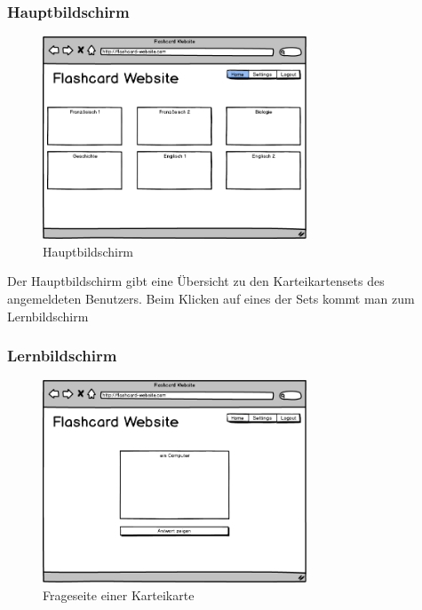 \subsubsection{Hauptbildschirm}

\begin{figure}[H]
    \centering
    \includegraphics[width=0.7\textwidth]{images/Overview.png}
    \caption{Hauptbildschirm}
    \label{fig:overview}
\end{figure}

Der Hauptbildschirm gibt eine Übersicht zu den Karteikartensets des angemeldeten Benutzers. Beim Klicken auf eines der Sets kommt man zum Lernbildschirm


\subsubsection{Lernbildschirm}


\begin{figure}[H]
    \centering
    \includegraphics[width=0.7\textwidth]{images/Lernscreen-Frage.png}
    \caption{Frageseite einer Karteikarte}
    \label{fig:lernscreen-frage}
\end{figure}

